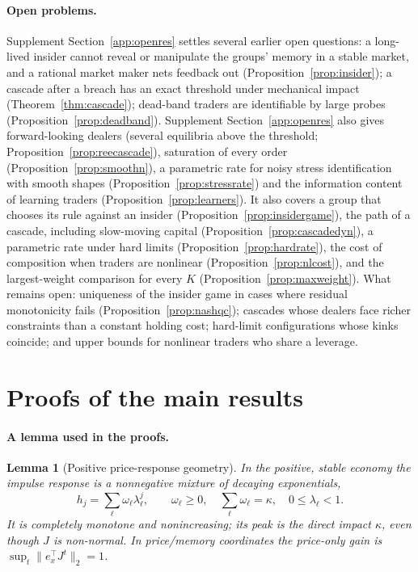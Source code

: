 \documentclass[12pt]{article}
\newtheorem{lemma}[theorem]{Lemma}
\theoremstyle{definition}
\theoremstyle{remark}
\begin{document}
\paragraph{Open problems.} Supplement Section~\ref{app:openres} settles several earlier open questions: a long-lived insider cannot reveal or manipulate the groups' memory in a stable market, and a rational market maker nets feedback out (Proposition~\ref{prop:insider}); a cascade after a breach has an exact threshold under mechanical impact (Theorem~\ref{thm:cascade}); dead-band traders are identifiable by large probes (Proposition~\ref{prop:deadband}). Supplement Section~\ref{app:openres} also gives forward-looking dealers (several equilibria above the threshold; Proposition~\ref{prop:reecascade}), saturation of every order (Proposition~\ref{prop:smoothn}), a parametric rate for noisy stress identification with smooth shapes (Proposition~\ref{prop:stressrate}) and the information content of learning traders (Proposition~\ref{prop:learners}). It also covers a group that chooses its rule against an insider (Proposition~\ref{prop:insidergame}), the path of a cascade, including slow-moving capital (Proposition~\ref{prop:cascadedyn}), a parametric rate under hard limits (Proposition~\ref{prop:hardrate}), the cost of composition when traders are nonlinear (Proposition~\ref{prop:nlcost}), and the largest-weight comparison for every $K$ (Proposition~\ref{prop:maxweight}). What remains open: uniqueness of the insider game in cases where residual monotonicity fails (Proposition~\ref{prop:nashqc}); cascades whose dealers face richer constraints than a constant holding cost; hard-limit configurations whose kinks coincide; and upper bounds for nonlinear traders who share a leverage.



\section{Proofs of the main results}\label{app:proofs}

\paragraph{A lemma used in the proofs.}
\begin{lemma}[Positive price-response geometry]\label{lem:cm}
In the positive, stable economy the impulse response is a nonnegative mixture of decaying exponentials,
\[
h_j=\sum_\ell \omega_\ell\lambda_\ell^j,\qquad \omega_\ell\ge0,\quad \sum_\ell\omega_\ell=\kappa,\quad 0\le\lambda_\ell<1 .
\]
It is completely monotone and nonincreasing; its peak is the direct impact $\kappa$, even though $J$ is non-normal. In price/memory coordinates the price-only gain is $\sup_t\|e_x^\top J^t\|_2=1$.
\end{lemma}
\end{document}
